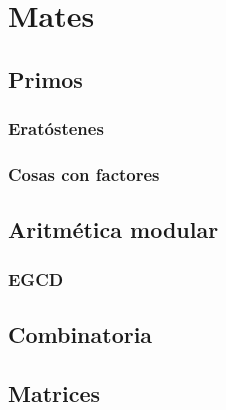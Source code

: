 \chapter{Mates}
\section{Primos}
\subsection{Eratóstenes}

\subsection{Cosas con factores}

\section{Aritmética modular}
\subsection{EGCD}


\section{Combinatoria}
\section{Matrices}
